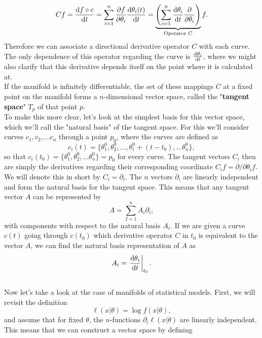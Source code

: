 \begin{equation}
	Cf = \frac{\mathrm{d}f\circ c}{\mathrm{d}t} = \sum_{i=1}^{n} \frac{\partial f}{\partial\theta_i}\frac{\mathrm{d}\theta_i(t)}{\mathrm{d}t} = \underbrace{\left(\sum_{i=1}^{n}\frac{\mathrm{d}\theta_i}{\mathrm{d}t}\frac{\partial}{\partial\theta_i}\right)}_{\text{Operator }C} f.
\end{equation}
Therefore we can associate a directional derivative operator $C$ with each curve. The only dependence of this operator regarding the curve is $\frac{\mathrm{d}\theta_i}{\mathrm{d}t}$, where we might also clarify that this derivative depends itself on the point where it is calculated at.\\
If the manifold is infinitely differentiable, the set of these mappings $C$ at a fixed point on the manifold forms a $n$-dimensional vector space, called the "\textbf{tangent space}" $T_p$ of that point $p$. \\
To make this more clear, let's look at the simplest basis for this vector space, which we'll call the "natural basis" of the tangent space. For this we'll consider curves $c_1,c_2, \dotsc c_n$ through a point $p_0$, where the curves are defined as 
\begin{equation}
	c_i(t) = \{\theta_1^0,\theta_2^0, \dotsc, \theta_i^0 + (t-t_0), \dotsc \theta_n^0 \},
\end{equation}
so that $c_i(t_0) = \{\theta_1^0,\theta_2^0, \dotsc\theta_n^0\} = p_0$ for every curve. The tangent vectors $C_i$ then are simply the derivatives regarding their corresponding coordinate $C_i f = \partial/\partial \theta_i f$. We will denote this in short by $C_i = \partial_i$. The $n$ vectors $\partial_i$ are linearly independent and form the natural basis for the tangent space. This means that any tangent vector $A$ can be represented by 
\begin{equation}
	A = \sum_{I=1}^{n} A_i \partial_i,
\end{equation}
with components with respect to the natural basis $A_i$. If we are given a curve $c(t)$ going through $c(t_0)$ which derivative operator $C$ in $t_0$ is equivalent to the vector $A$, we can find the natural basis representation of $A$ as
\begin{equation}
	A_i = \left. \frac{\mathrm{d}\theta_i}{\mathrm{d}t}\right|_{t_0}.
\end{equation} \\
Now let's take a look at the case of manifolds of statistical models. First, we will revisit the definition
\begin{equation}
	\ell(x|\theta) = \log f(x|\theta),
\end{equation}
and assume that for fixed $\theta$, the $n$-functions $\partial_i \ell(x|\theta)$ are linearly independent. This means that we can construct a vector space by defining
